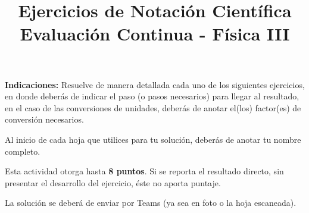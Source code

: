 \documentclass[14pt]{extarticle}
\title{\vspace*{-2cm} Ejercicios de Notación Científica \\  Evaluación Continua - Física III\vspace{-5ex}}
\date{}
\begin{document}
\maketitle

\textbf{Indicaciones:} Resuelve de manera detallada cada uno de los siguientes ejercicios, en donde deberás de indicar el paso (o pasos necesarios) para llegar al resultado, en el caso de las conversiones de unidades, deberás de anotar el(los) factor(es) de conversión necesarios.
\par
Al inicio de cada hoja que utilices para tu solución, deberás de anotar tu nombre completo.
\par
Esta actividad otorga hasta \textbf{8 puntos}. Si se reporta el resultado directo, sin presentar el desarrollo del ejercicio, éste no aporta puntaje.
\par
La solución se deberá de enviar por Teams (ya sea en foto o la hoja escaneada).
\end{document}
